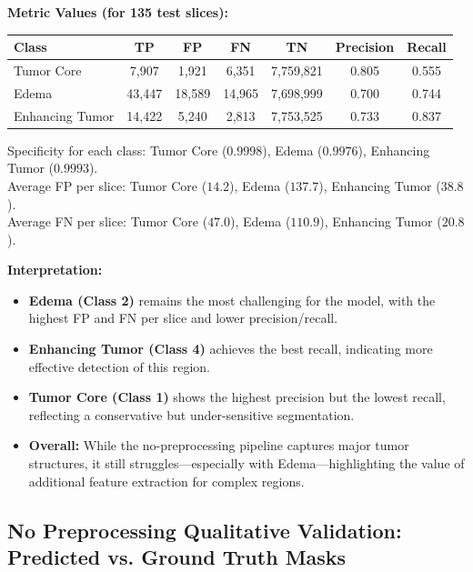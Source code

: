 \textbf{Metric Values (for 135 test slices):}
\begin{center}
\begin{tabular}{lcccccc}
\toprule
\textbf{Class} & \textbf{TP} & \textbf{FP} & \textbf{FN} & \textbf{TN} & \textbf{Precision} & \textbf{Recall} \\
\midrule
Tumor Core       & 7,907  & 1,921   & 6,351   & 7,759,821 & 0.805 & 0.555 \\
Edema            & 43,447 & 18,589  & 14,965  & 7,698,999 & 0.700 & 0.744 \\
Enhancing Tumor  & 14,422 & 5,240   & 2,813   & 7,753,525 & 0.733 & 0.837 \\
\bottomrule
\end{tabular}
\end{center}

\noindent
Specificity for each class: Tumor Core ($0.9998$), Edema ($0.9976$), Enhancing Tumor ($0.9993$).\\
Average FP per slice: Tumor Core ($14.2$), Edema ($137.7$), Enhancing Tumor ($38.8$).\\
Average FN per slice: Tumor Core ($47.0$), Edema ($110.9$), Enhancing Tumor ($20.8$).

\clearpage

\textbf{Interpretation:}
\begin{itemize}
    \item \textbf{Edema (Class 2)} remains the most challenging for the model, with the highest FP and FN per slice and lower precision/recall.
    \item \textbf{Enhancing Tumor (Class 4)} achieves the best recall, indicating more effective detection of this region.
    \item \textbf{Tumor Core (Class 1)} shows the highest precision but the lowest recall, reflecting a conservative but under-sensitive segmentation.
    \item \textbf{Overall:} While the no-preprocessing pipeline captures major tumor structures, it still struggles—especially with Edema—highlighting the value of additional feature extraction for complex regions.
\end{itemize}


\FloatBarrier



\subsection{No Preprocessing Qualitative Validation: Predicted vs. Ground Truth Masks}
\label{sec:no_preprocessing_qualitative_validation}

